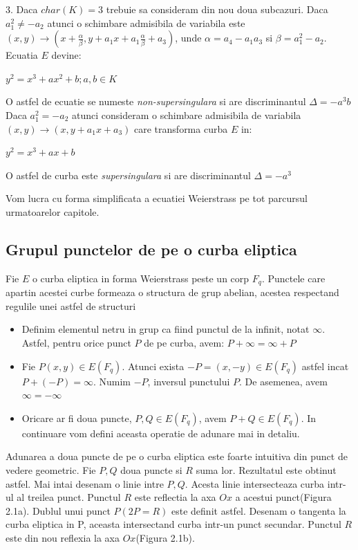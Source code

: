 \begin{dfn}
3. Daca $char(K) = 3$ trebuie sa consideram din nou doua subcazuri. Daca $a_1^2 \neq -a_2$ atunci o schimbare admisibila de variabila este
$(x, y) \rightarrow (x + \frac{\alpha}{\beta}, y + a_1x + a_1\frac{\alpha}{\beta} + a_3)$, unde $\alpha = a_4 -a_1a_3$ si $\beta = a_1^2 - a_2$. Ecuatia $E$ devine: 
\begin{center} $y^2 = x^3 + ax^2 + b; a, b\in K$\end{center}
O astfel de ecuatie se numeste \textit{non-supersingulara} si are discriminantul $\Delta = -a^3b$ \\
Daca $a_1^2 = -a_2$ atunci consideram o schimbare admisibila de variabila $(x, y) \rightarrow (x, y + a_1x + a_3)$ care transforma curba $E$ in:
\begin{center} $y^2 = x^3 + ax + b$ \end{center}
O astfel de curba este \textit{supersingulara} si are discriminantul $\Delta = -a^3$
\end{dfn}

\begin{obs}
Vom lucra cu forma simplificata a ecuatiei Weierstrass pe tot parcursul urmatoarelor capitole.
\end{obs}

\subsection{Grupul punctelor de pe o curba eliptica}
\label{subsec:subsec01}
Fie $E$ o curba eliptica in forma Weierstrass peste un corp $F_q$. Punctele care apartin acestei curbe formeaza o structura de grup abelian, acestea respectand regulile unei astfel de structuri

\begin{itemize}
  \item Definim elementul netru in grup ca fiind punctul de la infinit, notat $\infty$. Astfel, pentru orice punct $P$ de pe curba, avem: $P + \infty = \infty + P$
  \item Fie $P(x, y)\in E(F_q)$. Atunci exista $-P = (x, -y) \in E(F_q)$ astfel incat $P+ (-P) = \infty$. Numim $-P$, inversul punctului $P$. De asemenea, avem $\infty = -\infty$
  \item Oricare ar fi doua puncte, $P, Q\in E(F_q)$, avem $P + Q \in E(F_q)$. In continuare vom defini aceasta operatie de adunare mai in detaliu.
\end{itemize}

\begin{dfn}
Adunarea a doua puncte de pe o curba eliptica este foarte intuitiva din punct de vedere geometric. Fie $P, Q$ doua puncte si $R$ suma lor. Rezultatul este obtinut astfel. Mai intai desenam o linie intre $P, Q$. Acesta linie intersecteaza curba intr-ul al treilea punct. Punctul $R$ este reflectia la axa $Ox$ a acestui punct(Figura 2.1a). Dublul unui punct $P(2P = R)$ este definit astfel. Desenam o tangenta la curba eliptica in P, aceasta intersectand curba intr-un punct secundar. Punctul $R$ este din nou reflexia la axa $Ox$(Figura 2.1b).  
\end{dfn}

